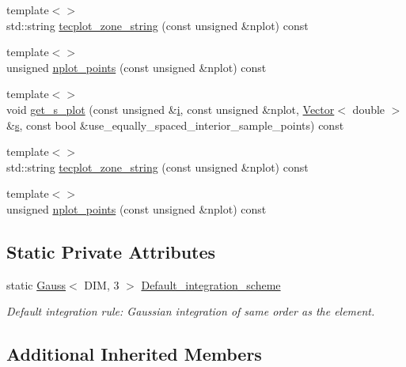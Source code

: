 \begin{DoxyCompactItemize}
\item 
{\footnotesize template$<$$>$ }\\std\+::string \hyperlink{classoomph_1_1QHermiteElement_a0aeaeaf09670be9db120e578527a003e}{tecplot\+\_\+zone\+\_\+string} (const unsigned \&nplot) const
\item 
{\footnotesize template$<$$>$ }\\unsigned \hyperlink{classoomph_1_1QHermiteElement_a97a492c5be028112ec449d5a973a4fe7}{nplot\+\_\+points} (const unsigned \&nplot) const
\item 
{\footnotesize template$<$$>$ }\\void \hyperlink{classoomph_1_1QHermiteElement_ad02d9dfe6e50410f5fac2804dcad9f76}{get\+\_\+s\+\_\+plot} (const unsigned \&\hyperlink{cfortran_8h_adb50e893b86b3e55e751a42eab3cba82}{i}, const unsigned \&nplot, \hyperlink{classoomph_1_1Vector}{Vector}$<$ double $>$ \&\hyperlink{cfortran_8h_ab7123126e4885ef647dd9c6e3807a21c}{s}, const bool \&use\+\_\+equally\+\_\+spaced\+\_\+interior\+\_\+sample\+\_\+points) const
\item 
{\footnotesize template$<$$>$ }\\std\+::string \hyperlink{classoomph_1_1QHermiteElement_a1de256ecd9b74e749ee298f64c096557}{tecplot\+\_\+zone\+\_\+string} (const unsigned \&nplot) const
\item 
{\footnotesize template$<$$>$ }\\unsigned \hyperlink{classoomph_1_1QHermiteElement_a3c5d93116e819f41baf0f90c03e13bbd}{nplot\+\_\+points} (const unsigned \&nplot) const
\end{DoxyCompactItemize}
\subsection*{Static Private Attributes}
\begin{DoxyCompactItemize}
\item 
static \hyperlink{classoomph_1_1Gauss}{Gauss}$<$ D\+IM, 3 $>$ \hyperlink{classoomph_1_1QHermiteElement_a51a474fe0cd5c8986bd68a94a0e369b7}{Default\+\_\+integration\+\_\+scheme}
\begin{DoxyCompactList}\small\item\em Default integration rule\+: Gaussian integration of same \textquotesingle{}order\textquotesingle{} as the element. \end{DoxyCompactList}\end{DoxyCompactItemize}
\subsection*{Additional Inherited Members}


